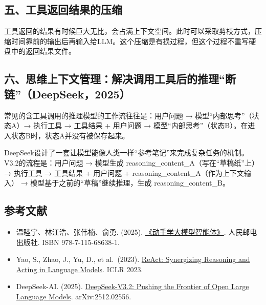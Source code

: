 \hypertarget{ux4e94ux5de5ux5177ux8fd4ux56deux7ed3ux679cux7684ux538bux7f29}{%
\subsection{五、工具返回结果的压缩}\label{ux4e94ux5de5ux5177ux8fd4ux56deux7ed3ux679cux7684ux538bux7f29}}

工具返回的结果有时候巨大无比，会占满上下文空间。此时可以采取剪枝方式，压缩时间靠前的输出后再输入给LLM。这个压缩是有损过程，但这个过程不重写硬盘中的返回结果文件。

\hypertarget{ux516dux601dux7ef4ux4e0aux4e0bux6587ux7ba1ux7406ux89e3ux51b3ux8c03ux7528ux5de5ux5177ux540eux7684ux63a8ux7406ux65adux94fedeepseek2025}{%
\subsection{六、思维上下文管理：解决调用工具后的推理``断链''（DeepSeek，2025）}\label{ux516dux601dux7ef4ux4e0aux4e0bux6587ux7ba1ux7406ux89e3ux51b3ux8c03ux7528ux5de5ux5177ux540eux7684ux63a8ux7406ux65adux94fedeepseek2025}}

常见的含工具调用的推理模型的工作流往往是：用户问题 → 模型``内部思考''（状态A）→ 执行工具 → 工具结果 + 用户问题 → 模型``内部思考''（状态B）。在进入状态B时，状态A并没有被保存起来。

DeepSeek设计了一套让模型能像人类一样``参考笔记''来完成复杂任务的机制。V3.2的流程是：用户问题 → 模型生成 reasoning\_content\_A（写在``草稿纸''上）→ 执行工具 → 工具结果 + 用户问题 + reasoning\_content\_A（作为上下文输入） → 模型基于之前的``草稿''继续推理，生成 reasoning\_content\_B。

\hypertarget{ux53c2ux8003ux6587ux732e-122}{%
\subsection{参考文献}\label{ux53c2ux8003ux6587ux732e-122}}

\vspace{0.25em}
\begin{itemize}
\tightlist
\item
  温睦宁、林江浩、张伟楠、俞勇. (2025). \href{https://haa.boyuai.com/}{《动手学大模型智能体》}. 人民邮电出版社. ISBN 978-7-115-68638-1.
\item
  Yao, S., Zhao, J., Yu, D., et al.~(2023). \href{https://arxiv.org/abs/2210.03629}{ReAct: Synergizing Reasoning and Acting in Language Models}. ICLR 2023.
\item
  DeepSeek-AI. (2025). \href{https://arxiv.org/abs/2512.02556}{DeepSeek-V3.2: Pushing the Frontier of Open Large Language Models}. arXiv:2512.02556.
\end{itemize}

